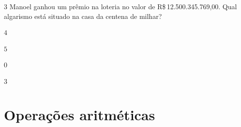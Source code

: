 





\num{3} Manoel ganhou um prêmio na loteria no valor de R\$\,12.500.345.769,00.
Qual algarismo está situado na casa da centena de milhar?

\begin{escolha}
\item $4$
\item $5$
\item $0$
\item $3$
\end{escolha}








\chapter{Operações
aritméticas}

